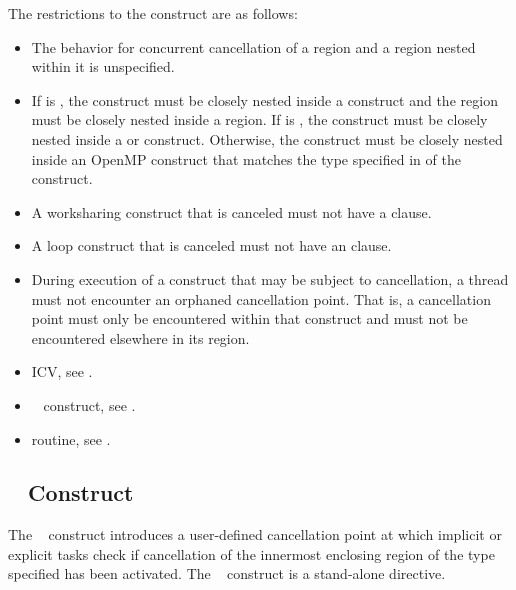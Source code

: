 {{{{\restrictions
The restrictions to the  construct are as follows:

\begin{itemize}
\item The behavior for concurrent cancellation of a region and a region nested within it is 
unspecified.

\item If  is , the 
construct must be closely nested inside a  construct and the
 region must be closely nested inside a  region. If
 is , the  construct
must be closely nested inside a  or  construct.
Otherwise, the  construct must be closely
nested inside an OpenMP construct that matches the type specified in
 of the  construct.

\item A worksharing construct that is canceled must not have a  clause.

\item A loop construct that is canceled must not have an  clause.

\item During execution of a construct that may be subject to cancellation, a
thread must not encounter an orphaned cancellation point. That is, a
cancellation point must only be encountered within that construct and must
not be encountered elsewhere in its region.
\end{itemize}

\crossreferences
\begin{itemize}
\item {} ICV, see
.

\item {}~ construct, see 
.

\item {} routine, see 
.
\end{itemize}









\subsection{~ Construct}
\label{subsec:cancellation point Construct}
\summary
The ~ construct introduces a user-defined cancellation point at 
which implicit or explicit tasks check if cancellation of the innermost enclosing region 
of the type specified has been activated. The ~ construct is a 
stand-alone directive.

}}}}
